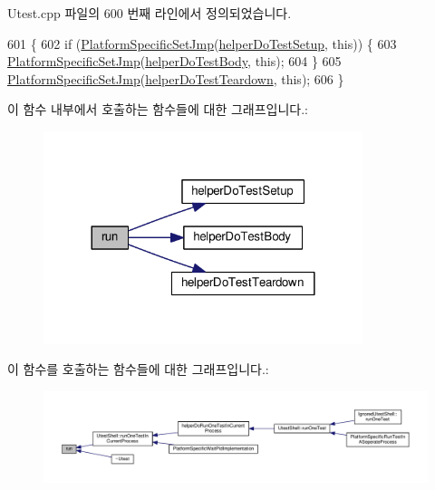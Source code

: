 Utest.\+cpp 파일의 600 번째 라인에서 정의되었습니다.


\begin{DoxyCode}
601 \{
602     \textcolor{keywordflow}{if} (\hyperlink{_platform_specific_functions__c_8h_a62b2f0c0b77d60a64cded04f9fd503a2}{PlatformSpecificSetJmp}(\hyperlink{_utest_8cpp_ace567468723f573c8caa454d49d693db}{helperDoTestSetup}, \textcolor{keyword}{this})) \{
603         \hyperlink{_platform_specific_functions__c_8h_a62b2f0c0b77d60a64cded04f9fd503a2}{PlatformSpecificSetJmp}(\hyperlink{_utest_8cpp_a50a5a5c825548048f7e1df06120dba12}{helperDoTestBody}, \textcolor{keyword}{this});
604     \}
605     \hyperlink{_platform_specific_functions__c_8h_a62b2f0c0b77d60a64cded04f9fd503a2}{PlatformSpecificSetJmp}(\hyperlink{_utest_8cpp_a01047b22d113aea8036022dd1358dd02}{helperDoTestTeardown}, \textcolor{keyword}{this});
606 \}
\end{DoxyCode}


이 함수 내부에서 호출하는 함수들에 대한 그래프입니다.\+:
\nopagebreak
\begin{figure}[H]
\begin{center}
\leavevmode
\includegraphics[width=264pt]{class_utest_a13a43e6d814de94978c515cb084873b1_cgraph}
\end{center}
\end{figure}




이 함수를 호출하는 함수들에 대한 그래프입니다.\+:
\nopagebreak
\begin{figure}[H]
\begin{center}
\leavevmode
\includegraphics[width=350pt]{class_utest_a13a43e6d814de94978c515cb084873b1_icgraph}
\end{center}
\end{figure}


